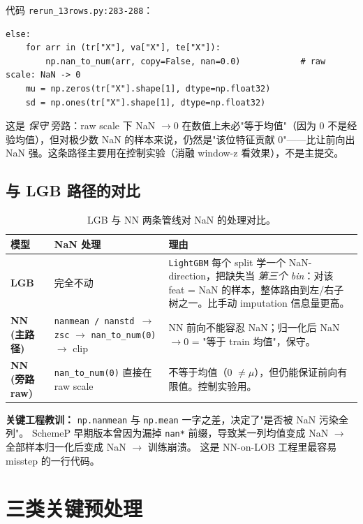 \documentclass[10.5pt,a4paper]{article}
\begin{document}
代码 \texttt{rerun\_13rows.py:283-288}：

\begin{lstlisting}
else:
    for arr in (tr["X"], va["X"], te["X"]):
        np.nan_to_num(arr, copy=False, nan=0.0)            # raw scale: NaN -> 0
    mu = np.zeros(tr["X"].shape[1], dtype=np.float32)
    sd = np.ones(tr["X"].shape[1], dtype=np.float32)
\end{lstlisting}

这是 \emph{保守} 旁路：raw scale 下 NaN $\to 0$ 在数值上未必"等于均值"（因为 0 不是经验均值），但对极少数 NaN 的样本来说，仍然是"该位特征贡献 0"——比让前向出 NaN 强。这条路径主要用在控制实验（消融 window-z 看效果），不是主提交。

\subsection{与 LGB 路径的对比}

\begin{table}[H]
\centering\small
\begin{tabular}{p{} p{} p{}}
\toprule
模型 & NaN 处理 & 理由 \\
\midrule
\textbf{LGB} & 完全不动 & \texttt{LightGBM} 每个 split 学一个 NaN-direction，把缺失当 \emph{第三个 bin}：对该 feat = NaN 的样本，整体路由到左/右子树之一。比手动 imputation 信息量更高。 \\
\textbf{NN (主路径)} & \texttt{nanmean / nanstd $\to$ zsc} $\to$ \texttt{nan\_to\_num(0)} $\to$ clip & NN 前向不能容忍 NaN；归一化后 NaN $\to 0$ = "等于 train 均值"，保守。 \\
\textbf{NN (旁路 raw)} & \texttt{nan\_to\_num(0)} 直接在 raw scale & 不等于均值（0 $\ne \mu$），但仍能保证前向有限值。控制实验用。 \\
\bottomrule
\end{tabular}
\caption{LGB 与 NN 两条管线对 NaN 的处理对比。}
\end{table}

\textbf{关键工程教训：} \texttt{np.nanmean} 与 \texttt{np.mean} 一字之差，决定了"是否被 NaN 污染全列"。
SchemeP 早期版本曾因为漏掉 \texttt{nan*} 前缀，导致某一列均值变成 NaN $\to$ 全部样本归一化后变成 NaN $\to$ 训练崩溃。
这是 NN-on-LOB 工程里最容易 misstep 的一行代码。

\section{三类关键预处理}
\end{document}

